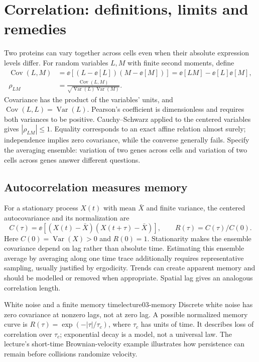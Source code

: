 \section{Correlation: definitions, limits and remedies}\label{sec:lecture03-correlation}
Two proteins can vary together across cells even when their absolute expression levels differ. For random variables $L,M$ with finite second moments, define
\begin{align}
\operatorname{Cov}(L,M)&=\ee[(L-\ee[L])(M-\ee[M])]
=\ee[LM]-\ee[L]\ee[M],\label{eq:lecture03-covariance}\\
\rho_{LM}&=\frac{\operatorname{Cov}(L,M)}{\sqrt{\operatorname{Var}(L)\operatorname{Var}(M)}}.\label{eq:lecture03-pearson}
\end{align}
Covariance has the product of the variables' units, and $\operatorname{Cov}(L,L)=\operatorname{Var}(L)$. Pearson's coefficient is dimensionless and requires both variances to be positive. Cauchy--Schwarz applied to the centered variables gives $|\rho_{LM}|\leq1$. Equality corresponds to an exact affine relation almost surely; independence implies zero covariance, while the converse generally fails. Specify the averaging ensemble: variation of two genes across cells and variation of two cells across genes answer different questions.

\subsection{Autocorrelation measures memory}\label{subsec:lecture03-autocorrelation}
For a stationary process $X(t)$ with mean $\bar X$ and finite variance, the centered autocovariance and its normalization are
\begin{equation}\label{eq:lecture03-autocorrelation}
C(\tau)=\ee[(X(t)-\bar X)(X(t+\tau)-\bar X)],\qquad
R(\tau)=C(\tau)/C(0).
\end{equation}
Here $C(0)=\operatorname{Var}(X)>0$ and $R(0)=1$. Stationarity makes the ensemble covariance depend on lag rather than absolute time. Estimating this ensemble average by averaging along one time trace additionally requires representative sampling, usually justified by ergodicity. Trends can create apparent memory and should be modelled or removed when appropriate. Spatial lag gives an analogous correlation length.
\begin{example}{White noise and a finite memory time}{lecture03-memory}
Discrete white noise has zero covariance at nonzero lags, not at zero lag. A possible normalized memory curve is $R(\tau)=\exp(-|\tau|/\tau_c)$, where $\tau_c$ has units of time. It describes loss of correlation over $\tau_c$; exponential decay is a model, not a universal law. The lecture's short-time Brownian-velocity example illustrates how persistence can remain before collisions randomize velocity.
\end{example}

